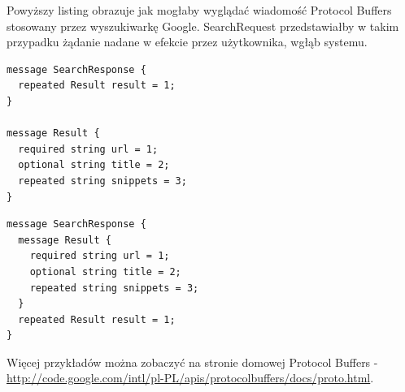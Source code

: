 Powyższy listing obrazuje jak mogłaby wyglądać wiadomość Protocol Buffers stosowany przez wyszukiwarkę Google.
SearchRequest przedstawiałby w takim przypadku żądanie nadane w efekcie przez użytkownika, wgłąb systemu.

\newpage
\begin{lstlisting}[caption={Definicja wiadoomści wykorzystującej inną wiadomość}, label={something1}]
message SearchResponse {
  repeated Result result = 1;
}

message Result {
  required string url = 1;
  optional string title = 2;
  repeated string snippets = 3;
}
\end{lstlisting}

\begin{lstlisting}[caption={Definicja wiadomości korzystającej z wewnętrznej wiadomości}, label={something2}]
message SearchResponse {
  message Result {
    required string url = 1;
    optional string title = 2;
    repeated string snippets = 3;
  }
  repeated Result result = 1;
}
\end{lstlisting}

Więcej przykładów można zobaczyć na stronie domowej Protocol Buffers - \href{http://code.google.com/intl/pl-PL/apis/protocolbuffers/docs/proto.html}{http://code.google.com/intl/pl-PL/apis/protocolbuffers/docs/proto.html}.
